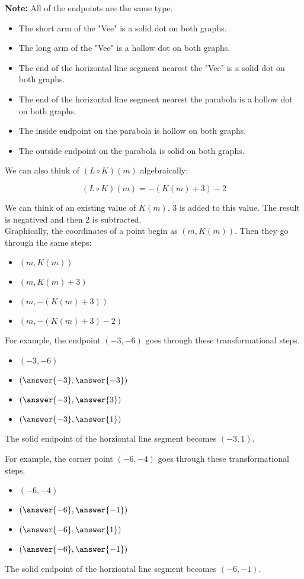 \documentclass{ximera}
\begin{document}
\textbf{Note:} All of the endpoints are the same type.  

\begin{itemize}
\item The short arm of the "Vee" is a solid dot on both graphs.
\item The long arm of the "Vee" is a hollow dot on both graphs.
\item The end of the horizontal line segment nearest the "Vee" is a solid dot on both graphs.
\item The end of the horizontal line segment nearest the parabola is a hollow dot on both graphs.
\item The inside endpoint on the parabola is hollow on both graphs.
\item The outside endpoint on the parabola is solid on both graphs.
\end{itemize}



We can also think of $(L \circ K)(m)$ algebraically:


\[
(L \circ K)(m) = -(K(m)+3) - 2
\]


We can think of an existing value of $K(m)$.  $3$ is added to this value. The result is negatived and then $2$ is subtracted. \\

Graphically, the coordinates of a point begin as $(m, K(m))$.  Then they go through the same steps: 


\begin{itemize}
\item $(m, K(m))$
\item $(m, K(m) + 3)$
\item $(m, -(K(m) + 3))$
\item $(m, -(K(m) + 3) - 2)$
\end{itemize}


For example, the endpoint $(-3, -6)$ goes through these transformational steps.

\begin{itemize}
\item $(-3, -6)$
\item $\left( \answer{-3},  \answer{-3} \right)$
\item $\left( \answer{-3},  \answer{3} \right)$
\item $\left( \answer{-3},  \answer{1} \right)$
\end{itemize}

The solid endpoint of the horziontal line segment becomes $(-3, 1)$.



For example, the corner point $(-6, -4)$ goes through these transformational steps.

\begin{itemize}
\item $(-6, -4)$
\item $\left( \answer{-6},  \answer{-1} \right)$
\item $\left( \answer{-6},  \answer{1} \right)$
\item $\left( \answer{-6},  \answer{-1} \right)$
\end{itemize}

The solid endpoint of the horziontal line segment becomes $(-6, -1)$.
\end{document}
